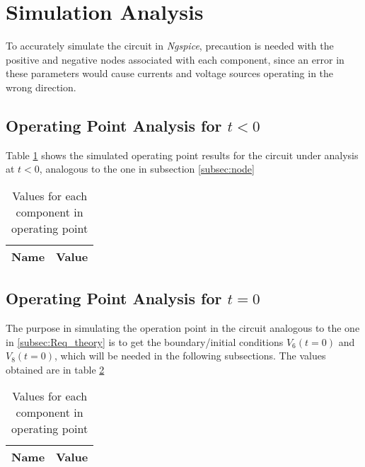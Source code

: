 \section{Simulation Analysis}
\label{sec:simulation}

To accurately simulate the circuit in \textit{Ngspice}, precaution is needed with the positive and negative nodes associated with each component, since an error in these parameters would cause currents and voltage sources operating in the wrong direction.


\subsection{Operating Point Analysis for $t<0$}
\label{subsec:OP_t<0}

Table \ref{tabopS} shows the simulated operating point results for the circuit under analysis at $t<0$, analogous to the one in subsection \ref{subsec:node}

\begin{table}[!ht]
  \centering
  \begin{tabular}{|l|r|}
    \hline    
    {\bf Name} & {\bf Value} \\ \hline
    
  \end{tabular}
  \caption{Values for each component in operating point}
  \label{tabopS}
\end{table}

\newpage

\subsection{Operating Point Analysis for $t=0$}
\label{subsec:OP_t=0}


The purpose in simulating the operation point in the circuit analogous to the one in \ref{subsec:Req_theory} is to get the boundary/initial conditions $V_6(t=0)$ and $V_8(t=0)$, which will be needed in the following subsections. The values obtained are in table \ref{tabop2S}

\begin{table}[!ht]
  \centering
  \begin{tabular}{|l|r|}
    \hline    
    {\bf Name} & {\bf Value} \\ \hline
    
  \end{tabular}
  \caption{Values for each component in operating point}
  \label{tabop2S}
\end{table}

